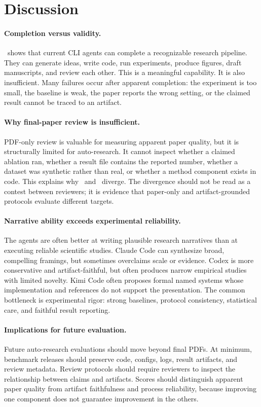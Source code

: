 \section{Discussion}

\paragraph{Completion versus validity.}
\ra\ shows that current CLI agents can complete a recognizable research pipeline. They can generate ideas, write code, run experiments, produce figures, draft manuscripts, and review each other. This is a meaningful capability. It is also insufficient. Many failures occur after apparent completion: the experiment is too small, the baseline is weak, the paper reports the wrong setting, or the claimed result cannot be traced to an artifact.

\paragraph{Why final-paper review is insufficient.}
PDF-only review is valuable for measuring apparent paper quality, but it is structurally limited for auto-research. It cannot inspect whether a claimed ablation ran, whether a result file contains the reported number, whether a dataset was synthetic rather than real, or whether a method component exists in code. This explains why \sar\ and \pr\ diverge. The divergence should not be read as a contest between reviewers; it is evidence that paper-only and artifact-grounded protocols evaluate different targets.

\paragraph{Narrative ability exceeds experimental reliability.}
The agents are often better at writing plausible research narratives than at executing reliable scientific studies. Claude Code can synthesize broad, compelling framings, but sometimes overclaims scale or evidence. Codex is more conservative and artifact-faithful, but often produces narrow empirical studies with limited novelty. Kimi Code often proposes formal named systems whose implementation and references do not support the presentation. The common bottleneck is experimental rigor: strong baselines, protocol consistency, statistical care, and faithful result reporting.

\paragraph{Implications for future evaluation.}
Future auto-research evaluations should move beyond final PDFs. At minimum, benchmark releases should preserve code, configs, logs, result artifacts, and review metadata. Review protocols should require reviewers to inspect the relationship between claims and artifacts. Scores should distinguish apparent paper quality from artifact faithfulness and process reliability, because improving one component does not guarantee improvement in the others.
